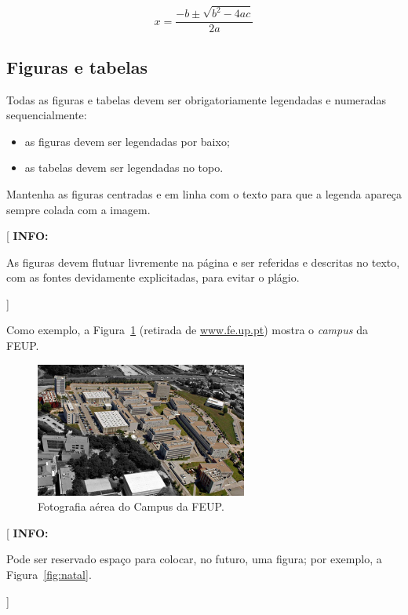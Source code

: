 \documentclass[11pt,a4paper]{report}
\newenvironment{info}[1]{\vspace*{6mm}\color{blue}[ \textbf{INFO:} \begin{em} #1}
                        {\vspace*{3mm}\end{em} ]}
\begin{document}
\begin{equation} \label{eq:2}
  x=\frac{-b\pm \sqrt{b^2-4ac}}{2a}
\end{equation}

\subsection*{Figuras e tabelas}

Todas as figuras e tabelas devem ser obrigatoriamente legendadas e
numeradas sequencialmente:

\begin{itemize}
\item as figuras devem ser legendadas por baixo;
\item as tabelas devem ser legendadas no topo. 
\end{itemize}

Mantenha as figuras centradas e em linha com o texto para que a
legenda apareça sempre colada com a imagem.

\begin{info}
As figuras devem flutuar livremente na página e ser referidas e
descritas no texto, com as fontes devidamente explicitadas, para
evitar o plágio.
\end{info}

Como exemplo, a Figura~\ref{fig:campus} (retirada de
\url{www.fe.up.pt}) mostra o \emph{campus} da FEUP. 

\lipsum[4]

\begin{figure}
\centering
\includegraphics[width=0.62\textwidth]{campus}
\caption{Fotografia aérea do Campus da FEUP.} \label{fig:campus}
\end{figure}

\lipsum[4]

\begin{info}
Pode ser reservado espaço para colocar, no futuro, uma figura; por
exemplo, a Figura~\ref{fig:natal}.
\end{info}
\end{document}
